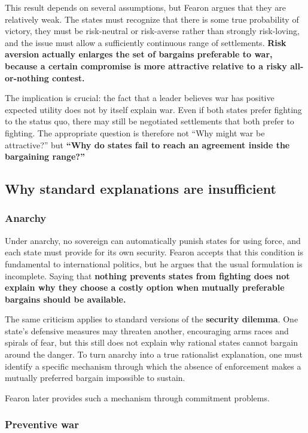 This result depends on several assumptions, but Fearon argues that they are relatively weak. The states must recognize that there is some true probability of victory, they must be risk-neutral or risk-averse rather than strongly risk-loving, and the issue must allow a sufficiently continuous range of settlements. \textbf{Risk aversion actually enlarges the set of bargains preferable to war, because a certain compromise is more attractive relative to a risky all-or-nothing contest.}

The implication is crucial: the fact that a leader believes war has positive expected utility does not by itself explain war. Even if both states prefer fighting to the status quo, there may still be negotiated settlements that both prefer to fighting. The appropriate question is therefore not ``Why might war be attractive?'' but \textbf{``Why do states fail to reach an agreement inside the bargaining range?''}

\subsection{Why standard explanations are insufficient}

\subsubsection{Anarchy}
Under anarchy, no sovereign can automatically punish states for using force, and each state must provide for its own security. Fearon accepts that this condition is fundamental to international politics, but he argues that the usual formulation is incomplete. Saying that \textbf{nothing prevents states from fighting does not explain why they choose a costly option when mutually preferable bargains should be available.}

The same criticism applies to standard versions of the \textbf{security dilemma}. One state's defensive measures may threaten another, encouraging arms races and spirals of fear, but this still does not explain why rational states cannot bargain around the danger. To turn anarchy into a true rationalist explanation, one must identify a specific mechanism through which the absence of enforcement makes a mutually preferred bargain impossible to sustain.

Fearon later provides such a mechanism through commitment problems.

\subsubsection{Preventive war}

